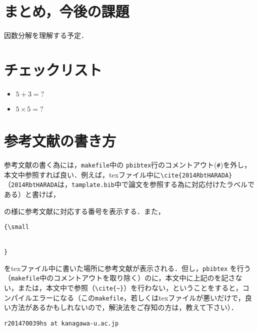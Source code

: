 \documentclass[10pt,twocolumn]{jarticle}
\begin{document}
\section{まとめ，今後の課題}
因数分解を理解する予定．

\par

{\small
 
 
}

\section{チェックリスト}
\begin{itemize}
\item $5 + 3 = ?$
\item $5 \times 5 = ?$
\end{itemize}

\appendix
\section{参考文献の書き方}

参考文献の書く為には，\verb|makefile|中の \verb|pbibtex|行のコメントアウト(\verb|#|)を外し，本文中参照すれば良い．例えば，texファイル中に\verb|\cite{2014RbtHARADA}|（\verb|2014RbtHARADA|は，\verb|tamplate.bib|中で論文\cite{2014RbtHARADA}を参照する為に対応付けたラベルである）と書けば，\par
{\centering

\cite{2014RbtHARADA}

}
\noindent の様に参考文献に対応する番号を表示する．また，

\begin{verbatim}
{\small


}
\end{verbatim}
をtexファイル中に書いた場所に参考文献が表示される．但し，\verb|pbibtex| を行う（\verb|makefile|中のコメントアウトを取り除く）のに，本文中に上記の\verb||を記さない，または，本文中で参照（\verb|\cite{~}|）を行わない，ということをすると，コンパイルエラーになる（この\verb|makefile|，若しくはtexファイルが悪いだけで，良い方法があるかもしれないので，解決法をご存知の方は，教えて下さい）．\par
\noindent \verb|r201470039hs at kanagawa-u.ac.jp|
\end{document}
